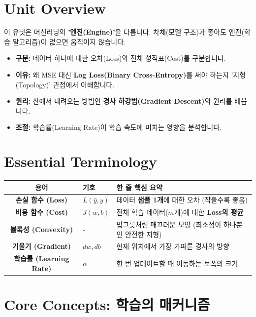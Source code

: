 \documentclass[11pt,a4paper]{book}
\theoremstyle{definition}
\begin{document}
\section{Unit Overview}
\begin{summarybox}[title={핵심 목표}]
이 유닛은 머신러닝의 \textbf{'엔진(Engine)'}을 다룹니다. 차체(모델 구조)가 좋아도 엔진(학습 알고리즘)이 없으면 움직이지 않습니다.
\begin{itemize}
    \item \textbf{구분:} 데이터 하나에 대한 오차(Loss)와 전체 성적표(Cost)를 구분합니다.
    \item \textbf{이유:} 왜 MSE 대신 \textbf{Log Loss(Binary Cross-Entropy)}를 써야 하는지 '지형(Topology)' 관점에서 이해합니다.
    \item \textbf{원리:} 산에서 내려오는 방법인 \textbf{경사 하강법(Gradient Descent)}의 원리를 배웁니다.
    \item \textbf{조절:} 학습률(Learning Rate)이 학습 속도에 미치는 영향을 분석합니다.
\end{itemize}
\end{summarybox}

\section{Essential Terminology}
\begin{center}
\begin{tabular}{|c|l|l|}
\hline
\textbf{용어} & \textbf{기호} & \textbf{한 줄 핵심 요약} \\ \hline
\textbf{손실 함수 (Loss)} & $L(\hat{y}, y)$ & 데이터 \textbf{샘플 1개}에 대한 오차 (작을수록 좋음) \\ \hline
\textbf{비용 함수 (Cost)} & $J(w, b)$ & 전체 학습 데이터($m$개)에 대한 \textbf{Loss의 평균} \\ \hline
\textbf{볼록성 (Convexity)} & - & 밥그릇처럼 매끄러운 모양 (최소점이 하나뿐인 안전한 지형) \\ \hline
\textbf{기울기 (Gradient)} & $dw, db$ & 현재 위치에서 가장 가파른 경사의 방향 \\ \hline
\textbf{학습률 (Learning Rate)} & $\alpha$ & 한 번 업데이트할 때 이동하는 보폭의 크기 \\ \hline
\end{tabular}
\end{center}

\section{Core Concepts: 학습의 매커니즘}
\end{document}
